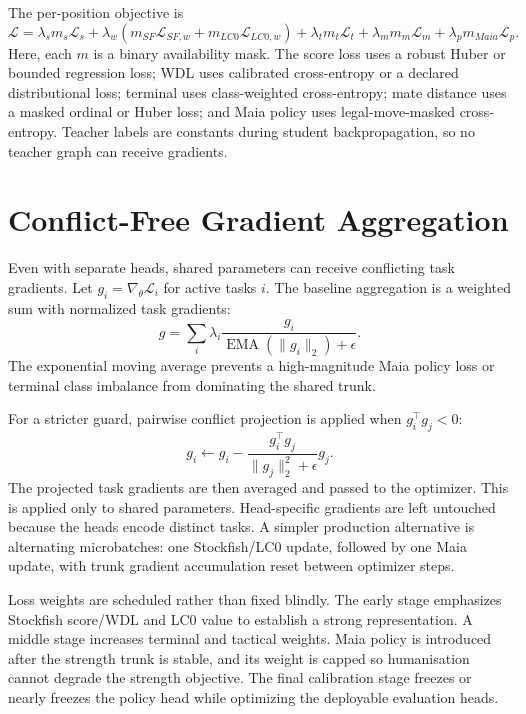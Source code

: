 \documentclass[conference]{IEEEtran}
\begin{document}
The per-position objective is
\begin{equation}
\mathcal{L}=\lambda_s m_s\mathcal{L}_s+\lambda_w(m_{SF}\mathcal{L}_{SF,w}+m_{LC0}\mathcal{L}_{LC0,w})
+\lambda_t m_t\mathcal{L}_t+\lambda_m m_m\mathcal{L}_m+\lambda_p m_{Maia}\mathcal{L}_p.
\end{equation}
Here, each $m$ is a binary availability mask. The score loss uses a robust Huber or bounded regression loss; WDL uses calibrated cross-entropy or a declared distributional loss; terminal uses class-weighted cross-entropy; mate distance uses a masked ordinal or Huber loss; and Maia policy uses legal-move-masked cross-entropy. Teacher labels are constants during student backpropagation, so no teacher graph can receive gradients.

\section{Conflict-Free Gradient Aggregation}
Even with separate heads, shared parameters can receive conflicting task gradients. Let $g_i=\nabla_{\theta}\mathcal{L}_i$ for active tasks $i$. The baseline aggregation is a weighted sum with normalized task gradients:
\begin{equation}
 g=\sum_i \lambda_i\frac{g_i}{\operatorname{EMA}(\|g_i\|_2)+\epsilon}.
\end{equation}
The exponential moving average prevents a high-magnitude Maia policy loss or terminal class imbalance from dominating the shared trunk.

For a stricter guard, pairwise conflict projection is applied when $g_i^\top g_j<0$:
\begin{equation}
 g_i\leftarrow g_i-\frac{g_i^\top g_j}{\|g_j\|_2^2+\epsilon}g_j.
\end{equation}
The projected task gradients are then averaged and passed to the optimizer. This is applied only to shared parameters. Head-specific gradients are left untouched because the heads encode distinct tasks. A simpler production alternative is alternating microbatches: one Stockfish/LC0 update, followed by one Maia update, with trunk gradient accumulation reset between optimizer steps.

Loss weights are scheduled rather than fixed blindly. The early stage emphasizes Stockfish score/WDL and LC0 value to establish a strong representation. A middle stage increases terminal and tactical weights. Maia policy is introduced after the strength trunk is stable, and its weight is capped so humanisation cannot degrade the strength objective. The final calibration stage freezes or nearly freezes the policy head while optimizing the deployable evaluation heads.
\end{document}
